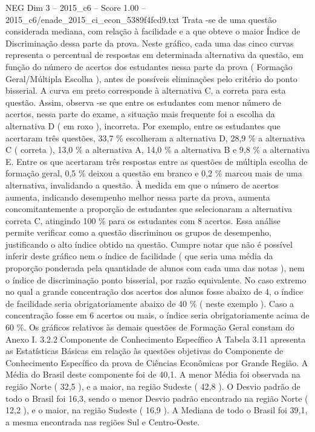 \begin{textsample}{NEG Dim 3 – 2015\_c6 – Score 1.00 – 2015\_c6/enade\_2015\_ci\_econ\_5389f4fcd9.txt}
Trata -se de uma questão considerada mediana, com relação à facilidade e a que obteve o maior Índice de Discriminação dessa parte da prova.
Neste gráfico, cada uma das cinco curvas representa o percentual de respostas em determinada alternativa da questão, em função do número de acertos dos estudantes nessa parte da prova ( Formação Geral/Múltipla Escolha ), antes de possíveis eliminações pelo critério do ponto bisserial.
A curva em preto corresponde à alternativa C, a correta para esta questão.
Assim, observa -se que entre os estudantes com menor número de acertos, nessa parte do exame, a situação mais frequente foi a escolha da alternativa D ( em roxo ), incorreta.
Por exemplo, entre os estudantes que acertaram três questões, 33,7 \% escolheram a alternativa D, 28,9 \% a alternativa C ( correta ), 13,0 \% a alternativa A, 14,0 \% a alternativa B e 9,8 \% a alternativa E.
Entre os que acertaram três respostas entre as questões de múltipla escolha de formação geral, 0,5 \% deixou a questão em branco e 0,2 \% marcou mais de uma alternativa, invalidando a questão.
À medida em que o número de acertos aumenta, indicando desempenho melhor nessa parte da prova, aumenta concomitantemente a proporção de estudantes que selecionaram a alternativa correta C, atingindo 100 \% para os estudantes com 8 acertos.
Essa análise permite verificar como a questão discriminou os grupos de desempenho, justificando o alto índice obtido na questão.
Cumpre notar que não é possível inferir deste gráfico nem o índice de facilidade ( que seria uma média da proporção ponderada pela quantidade de alunos com cada uma das notas ), nem o índice de discriminação ponto bisserial, por razão equivalente.
No caso extremo no qual a grande concentração dos acertos dos alunos fosse abaixo de 4, o índice de facilidade seria obrigatoriamente abaixo de 40 \% ( neste exemplo ).
Caso a concentração fosse em 6 acertos ou mais, o índice seria obrigatoriamente acima de 60 \%.
Os gráficos relativos às demais questões de Formação Geral constam do Anexo I. 3.2.2 Componente de Conhecimento Específico A Tabela 3.11 apresenta as Estatísticas Básicas em relação às questões objetivas do Componente de Conhecimento Específico da prova de Ciências Econômicas por Grande Região.
A Média do Brasil deste componente foi de 40,1.
A menor Média foi observada na região Norte ( 32,5 ), e a maior, na região Sudeste ( 42,8 ).
O Desvio padrão de todo o Brasil foi 16,3, sendo o menor Desvio padrão encontrado na região Norte ( 12,2 ), e o maior, na região Sudeste ( 16,9 ).
A Mediana de todo o Brasil foi 39,1, a mesma encontrada nas regiões Sul e Centro-Oeste.

\end{textsample}
